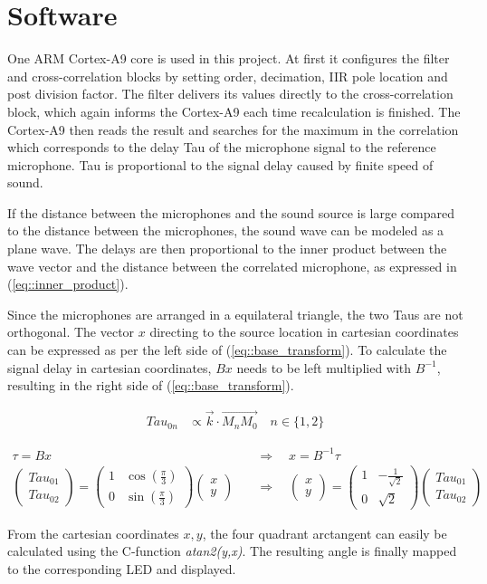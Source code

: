\section{Software}
\label{sec::software}

One ARM Cortex-A9 core is used in this project.
At first it configures the filter and cross-correlation blocks by setting order, decimation, IIR pole location and post division factor.
The filter delivers its values directly to the cross-correlation block, which again informs the Cortex-A9 each time recalculation is finished.
The Cortex-A9 then reads the result and searches for the maximum in the correlation which corresponds to the delay Tau of the microphone signal to the reference microphone. Tau is proportional to the signal delay caused by finite speed of sound.

If the distance between the microphones and the sound source is large compared to the distance between the microphones, the sound wave can be modeled as a plane wave.
The delays are then proportional to the inner product between the wave vector and the  distance between the correlated microphone, as expressed in (\ref{eq::inner_product}).

Since the microphones are arranged in a equilateral triangle, the two Taus are not orthogonal.
The vector $x$ directing to the source location in cartesian coordinates can be expressed as per the left side of (\ref{eq::base_transform}).
To calculate the signal delay in cartesian coordinates, $Bx$ needs to be left multiplied with $B^{-1}$, resulting in the right side of  (\ref{eq::base_transform}).

\begin{align}
	{Tau}_{0n} &\propto \overrightarrow{k} \cdot \overrightarrow{M_nM_0} \quad n\in\{1,2\}\label{eq::inner_product}
\end{align}

\begin{align}
	\tau = Bx \quad &\Rightarrow \quad x = B^{-1}\tau \label{eq::base_transform}\\
	\begin{pmatrix} {Tau}_{01} \\ {Tau}_{02}\end{pmatrix}
		=  \begin{pmatrix} 1 & \cos(\frac{\pi}{3}) \\ 0 & \sin(\frac{\pi}{3})\end{pmatrix} \begin{pmatrix} x \\ y\end{pmatrix}
	\quad &\Rightarrow \quad \begin{pmatrix} x \\ y \end{pmatrix}	= \begin{pmatrix} 1 & -\frac{1}{\sqrt{2}} \\ 0 & \sqrt{2}\end{pmatrix} \begin{pmatrix} {Tau}_{01} \\ {Tau}_{02}\end{pmatrix}
\end{align}

From the cartesian coordinates $x,y$, the four quadrant arctangent can easily be calculated using the C-function \emph{atan2(y,x)}.
The resulting angle is finally mapped to the corresponding LED and displayed.
